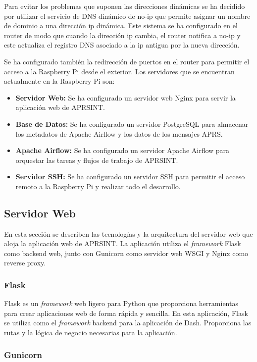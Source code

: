 Para evitar los problemas que suponen las direcciones dinámicas se ha decidido por utilizar el servicio de DNS dinámico de no-ip que permite asignar un nombre de dominio a una dirección ip dinámica. Este sistema se ha configurado en el router de modo que cuando la dirección ip cambia, el router notifica a no-ip y este actualiza el registro DNS asociado a la ip antigua por la nueva dirección.

Se ha configurado también la redirección de puertos en el router para permitir el acceso a la Raspberry Pi desde el exterior. Los servidores que se encuentran actualmente en la Raspberry Pi son:
\begin{itemize}
	\item \textbf{Servidor Web:} Se ha configurado un servidor web Nginx para servir la aplicación web de APRSINT.
	\item \textbf{Base de Datos:} Se ha configurado un servidor PostgreSQL para almacenar los metadatos de Apache Airflow y los datos de los mensajes APRS.
	\item \textbf{Apache Airflow:} Se ha configurado un servidor Apache Airflow para orquestar las tareas y flujos de trabajo de APRSINT.
	\item \textbf{Servidor SSH:} Se ha configurado un servidor SSH para permitir el acceso remoto a la Raspberry Pi y realizar todo el desarrollo.
\end{itemize}

\subsection{Servidor Web}

En esta sección se describen las tecnologías y la arquitectura del servidor web que aloja la aplicación web de APRSINT. La aplicación utiliza el \textit{framework} Flask como backend web, junto con Gunicorn como servidor web WSGI y Nginx como reverse proxy.

\subsubsection*{Flask}

Flask es un \textit{framework} web ligero para Python que proporciona herramientas para crear aplicaciones web de forma rápida y sencilla. En esta aplicación, Flask se utiliza como el \textit{framework} backend para la aplicación de Dash. Proporciona las rutas y la lógica de negocio necesarias para la aplicación.

\subsubsection*{Gunicorn}

